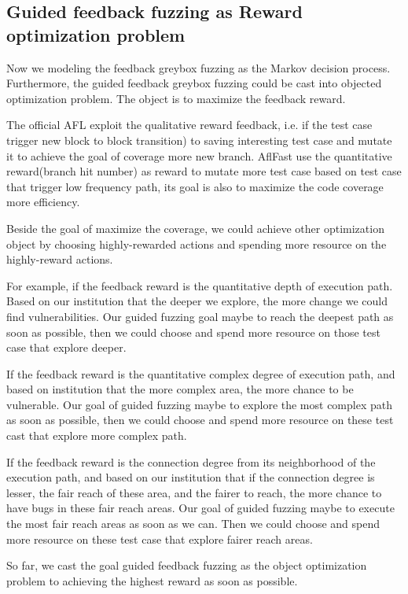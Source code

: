 \subsection{Guided feedback fuzzing as Reward optimization problem}

Now we modeling the feedback greybox fuzzing as the Markov decision process. Furthermore, the  guided feedback greybox fuzzing could be cast into objected optimization problem. The object is to maximize the feedback reward.

The official AFL exploit the qualitative reward feedback, i.e. if the test case trigger new block to block transition) to saving interesting test case and mutate it to achieve the goal of coverage more new branch. AflFast use the quantitative reward(branch hit number) as reward to mutate more test case based on test case that trigger low frequency path, its goal is also to maximize the code coverage more efficiency.

Beside the goal of maximize the coverage,  we could achieve other optimization object by choosing highly-rewarded actions and spending more resource on the highly-reward actions.

For example, if the feedback reward is the quantitative depth of execution path. Based on our institution that the deeper we explore, the more change we could find vulnerabilities. Our guided fuzzing goal maybe to reach the deepest path as soon as possible, then we could choose and spend more resource on those test case that explore deeper.

If the feedback reward is the quantitative complex degree of execution path, and based on institution that the more complex area, the more chance to be vulnerable. Our goal of guided fuzzing maybe to explore the most complex path as soon as possible, then we could choose and spend more resource on these test cast that explore more complex path.

If the feedback reward is the connection degree from its neighborhood of the execution path, and based on our institution that if the connection degree is lesser, the fair reach of these area, and the fairer to reach, the more chance to have bugs in these fair reach areas. Our goal of guided fuzzing maybe to execute the most fair reach areas as soon as we can. Then we could choose and spend more resource on these test case that explore  fairer reach areas.

So far, we  cast the goal guided feedback fuzzing as the object optimization problem to achieving the highest reward as soon as possible.

